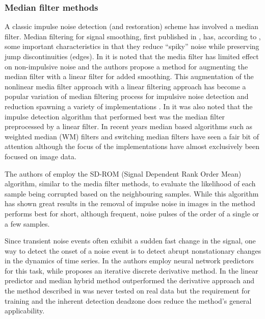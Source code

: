 \subsubsection{Median filter methods}
A classic impulse noise detection (and restoration) scheme has involved a median filter\cite{Tukey1974}\cite{Lee1985}\cite{Heinonen1985}\cite{Heinonen1987}\cite{Maekivirta1991}\cite{Kasparis1993}.
Median filtering for signal smoothing, first published in \cite{Tukey1974}, has, according to \cite{Brillinger2002}, some important characteristics in that they reduce ``spiky'' noise while preserving jump discontinuities (edges). In \cite{Lee1985} it is noted that the media filter has limited effect on non-impulsive noise and the authors propose a method for augmenting the median filter with a linear filter for added smoothing. This augmentation of the nonlinear media filter approach with a linear filtering approach has become a popular variation of median filtering process for impulsive noise detection and reduction spawning a variety of implementations \cite{Lee1985}\cite{Heinonen1985}\cite{Nieminen1987}\cite{Kasparis1993}\cite{Loveridge1995}. In \cite{Kauppinen2002} it was also noted that the impulse detection algorithm that performed best was the median filter preprocessed by a linear filter. In recent years median based algorithms such as weighted median (WM) filters \cite{Yin1996}\cite{Wang2010} and switching median filters \cite{Abreu1996}\cite{Chen2000}\cite{Chen2001}\cite{Lin2007} have seen a fair bit of attention although the focus of the implementations have almost exclusively been focused on image data.

The authors of \cite{Chandra1998} employ the SD-ROM (Signal Dependent Rank Order Mean) algorithm, similar to the media filter methods, to evaluate the likelihood of each sample being corrupted based on the neighbouring samples. While this algorithm has shown great results in the removal of impulse noise in images \cite{Abreu1996} in \cite{Chandra1998} the method performs best for short, although frequent, noise pulses of the order of a single or a few samples.

Since transient noise events often exhibit a sudden fast change in the signal, one way to detect the onset of a noise event is to detect abrupt nonstationary changes in the dynamics of time series. In \cite{Fancourt2000} the authors employ neural network predictors for this task, while \cite{Kauppinen2002} proposes an iterative discrete derivative method. In \cite{Kauppinen2002} the linear predictor and median hybrid method outperformed the derivative approach and the method described in \cite{Fancourt2000} was never tested on real data but the requirement for training and the inherent detection deadzone does reduce the method's general applicability.

